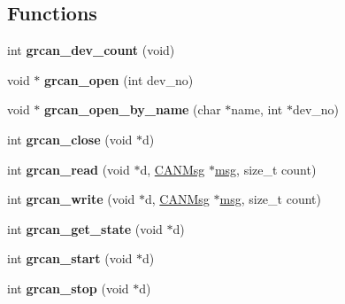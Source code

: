 \subsection*{Functions}
\begin{DoxyCompactItemize}
\item 
\mbox{\label{group__can_gaeda621947d6f789d9156d4ad10f7ed91}} 
int {\bfseries grcan\+\_\+dev\+\_\+count} (void)
\item 
\mbox{\label{group__can_ga4f226a980335ed0382f78b2ff2de8107}} 
void $\ast$ {\bfseries grcan\+\_\+open} (int dev\+\_\+no)
\item 
\mbox{\label{group__can_ga12900a0ea7dc0ae0cbf5aea0e7b08c14}} 
void $\ast$ {\bfseries grcan\+\_\+open\+\_\+by\+\_\+name} (char $\ast$name, int $\ast$dev\+\_\+no)
\item 
\mbox{\label{group__can_ga94f54295da3c7bc19ecb4961acc279a2}} 
int {\bfseries grcan\+\_\+close} (void $\ast$d)
\item 
\mbox{\label{group__can_gac3b58977d5a2b48cfd32c643c1a40efb}} 
int {\bfseries grcan\+\_\+read} (void $\ast$d, \mbox{\hyperlink{structCANMsg}{C\+A\+N\+Msg}} $\ast$\mbox{\hyperlink{structmsg}{msg}}, size\+\_\+t count)
\item 
\mbox{\label{group__can_ga1f962afeea03c9cb452ebedf432fa0c1}} 
int {\bfseries grcan\+\_\+write} (void $\ast$d, \mbox{\hyperlink{structCANMsg}{C\+A\+N\+Msg}} $\ast$\mbox{\hyperlink{structmsg}{msg}}, size\+\_\+t count)
\item 
\mbox{\label{group__can_ga16d91770daed020226c3bae97805c7aa}} 
int {\bfseries grcan\+\_\+get\+\_\+state} (void $\ast$d)
\item 
\mbox{\label{group__can_gae580a08a0c61a2ea597f902c315a2f73}} 
int {\bfseries grcan\+\_\+start} (void $\ast$d)
\item 
\mbox{\label{group__can_ga25d13313d32bbe40e7818a84b2057930}} 
int {\bfseries grcan\+\_\+stop} (void $\ast$d)
\item 
\mbox{\label{group__can_ga1a7e7a91c8ca7c8fa0a016b65ed31976}} 

\end{DoxyCompactItemize}
